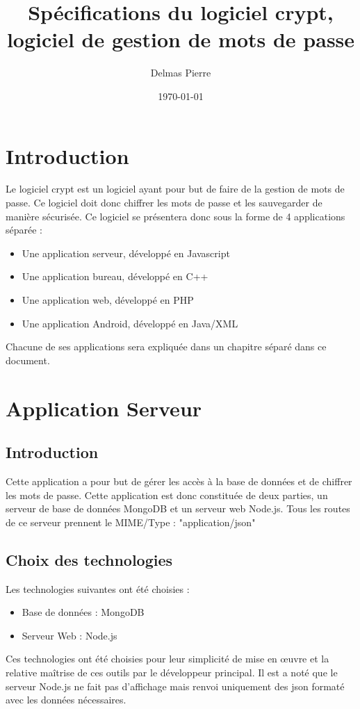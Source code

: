 \documentclass[12pt]{report}
\date{\today}
\title{Spécifications du logiciel crypt, logiciel de gestion de mots de passe}
\author{Delmas Pierre}
\begin{document}
	\maketitle
	\tableofcontents
	\printglossary[type=main,style=long,nonumberlist]
	\chapter{Introduction}
	Le logiciel crypt est un logiciel ayant pour but de faire de la gestion de mots de passe. Ce logiciel doit donc chiffrer les mots de passe et les sauvegarder de manière sécurisée. Ce logiciel se présentera donc sous la forme de 4 applications séparée : 
	\begin{itemize}
		\item Une application serveur, développé en Javascript
		\item Une application bureau, développé en C++
		\item Une application web, développé en PHP
		\item Une application Android, développé en Java/XML
	\end{itemize}
	Chacune de ses applications sera expliquée dans un chapitre séparé dans ce document.
	\chapter{Application Serveur}
	\section{Introduction}
	Cette application a pour but de gérer les accès à la base de données et de chiffrer les mots de passe. Cette application est donc constituée de deux parties, un serveur de base de données MongoDB et un serveur web Node.js.
	\newline
	Tous les routes de ce serveur prennent le MIME/Type : "application/json"
	\section{Choix des technologies}
	Les technologies suivantes ont été choisies :
	\begin{itemize}
		\item Base de données : MongoDB
		\item Serveur Web : Node.js
	\end{itemize}
	Ces technologies ont été choisies pour leur simplicité de mise en œuvre et la relative maîtrise de ces outils par le développeur principal.
	\newline
	Il est a noté que le serveur Node.js ne fait pas d'affichage mais renvoi uniquement des \gls{json} formaté avec les données nécessaires.
\end{document}
